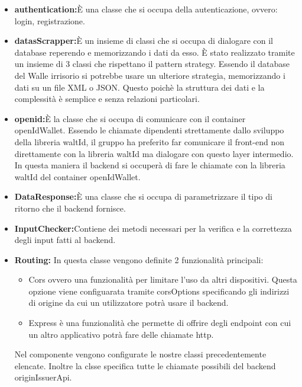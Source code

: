\begin{itemize}
    \item \textbf{authentication:}È una classe che si occupa della autenticazione, ovvero: login, registrazione. 
    \item \textbf{datasScrapper:}È un insieme di classi che si occupa di dialogare con il database reperendo e memorizzando i dati da esso. È stato realizzato tramite un insieme di 3 classi che rispettano il pattern strategy. Essendo il database del Walle irrisorio si potrebbe usare un ulteriore strategia, memorizzando i dati su un file XML o JSON. Questo poichè la struttura dei dati e la complessità è semplice e senza relazioni particolari.
    \item \textbf{openid:}È la classe che si occupa di comunicare con il container openIdWallet. Essendo le chiamate dipendenti strettamente dallo sviluppo della libreria waltId, il gruppo ha preferito far comunicare il front-end non direttamente con la libreria waltId ma dialogare con questo layer intermedio. In questa maniera il backend si occuperà di fare le chiamate con la libreria waltId del container openIdWallet.
    \item \textbf{DataResponse:}È una classe che si occupa di parametrizzare il tipo di ritorno che il backend fornisce.
    \item \textbf{InputChecker:}Contiene dei metodi necessari per la verifica e la correttezza degli input fatti al backend.
    \item \textbf{Routing:} In questa classe vengono definite 2 funzionalità principali:
    \begin{itemize}
    \item Cors ovvero una funzionalità per limitare l'uso da altri dispositivi. Questa opzione viene configuarata tramite corsOptions specificando gli indirizzi di origine da cui un utilizzatore potrà usare il backend. 
    \item Express è una funzionalità che permette di offrire degli endpoint con cui un altro applicativo potrà fare delle chiamate http. 
    \end{itemize}
    Nel componente vengono configurate le nostre classi precedentemente elencate.
    Inoltre la clsse specifica tutte le chiamate possibili del backend originIssuerApi.
\end{itemize}

